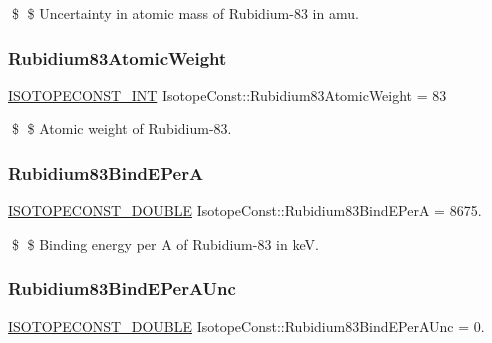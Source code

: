 \$ \$ Uncertainty in atomic mass of Rubidium-\/83 in amu. \mbox{\label{group___isotope_const-_rubidium-_rb83_gacedc15ef0f86ab22a29dbd4e709ac9b4}} 
\subsubsection{\texorpdfstring{Rubidium83\+Atomic\+Weight}{Rubidium83AtomicWeight}}
{\footnotesize\ttfamily \mbox{\hyperlink{group___isotope_const-_macros_ga5f18360b3e99483a35c32d789e62621c}{I\+S\+O\+T\+O\+P\+E\+C\+O\+N\+S\+T\+\_\+\+I\+NT}} Isotope\+Const\+::\+Rubidium83\+Atomic\+Weight = 83}

\$ \$ Atomic weight of Rubidium-\/83. \mbox{\label{group___isotope_const-_rubidium-_rb83_gaca52cb6833a5fb45052945a79feafb4c}} 
\subsubsection{\texorpdfstring{Rubidium83\+Bind\+E\+PerA}{Rubidium83BindEPerA}}
{\footnotesize\ttfamily \mbox{\hyperlink{group___isotope_const-_macros_ga8f45a7272ce02c0b4c65c44636ed719a}{I\+S\+O\+T\+O\+P\+E\+C\+O\+N\+S\+T\+\_\+\+D\+O\+U\+B\+LE}} Isotope\+Const\+::\+Rubidium83\+Bind\+E\+PerA = 8675.}

\$ \$ Binding energy per A of Rubidium-\/83 in keV. \mbox{\label{group___isotope_const-_rubidium-_rb83_gaa6b7466080e952e186e709a3ae5f27ba}} 
\subsubsection{\texorpdfstring{Rubidium83\+Bind\+E\+Per\+A\+Unc}{Rubidium83BindEPerAUnc}}
{\footnotesize\ttfamily \mbox{\hyperlink{group___isotope_const-_macros_ga8f45a7272ce02c0b4c65c44636ed719a}{I\+S\+O\+T\+O\+P\+E\+C\+O\+N\+S\+T\+\_\+\+D\+O\+U\+B\+LE}} Isotope\+Const\+::\+Rubidium83\+Bind\+E\+Per\+A\+Unc = 0.}

